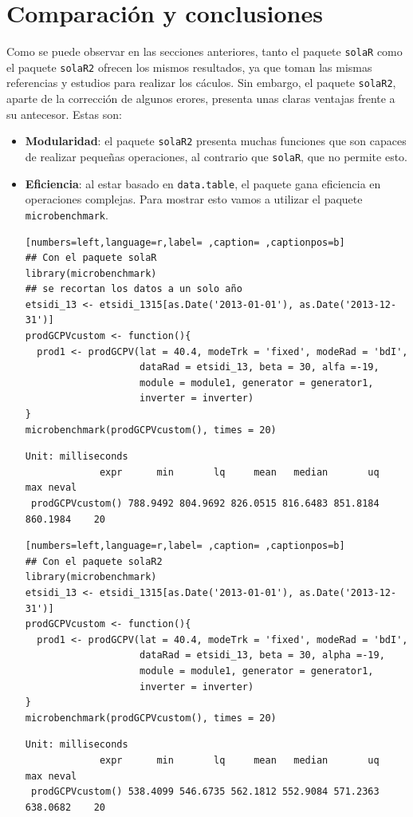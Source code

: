 \section{Comparación y conclusiones}
\label{sec:org032a66a}
\label{sec:comparacion-conclusiones}
Como se puede observar en las secciones anteriores, tanto el paquete \texttt{solaR} como el paquete \texttt{solaR2} ofrecen los mismos resultados, ya que toman las mismas referencias y estudios para realizar los cáculos. Sin embargo, el paquete \texttt{solaR2}, aparte de la corrección de algunos erores, presenta unas claras ventajas frente a su antecesor. Estas son:
\begin{itemize}
\item \textbf{Modularidad}: el paquete \texttt{solaR2} presenta muchas funciones que son capaces de realizar pequeñas operaciones, al contrario que \texttt{solaR}, que no permite esto.
\item \textbf{Eficiencia}: al estar basado en \texttt{data.table}, el paquete gana eficiencia en operaciones complejas. Para mostrar esto vamos a utilizar el paquete \texttt{microbenchmark}.
\begin{lstlisting}[numbers=left,language=r,label= ,caption= ,captionpos=b]
## Con el paquete solaR
library(microbenchmark)
## se recortan los datos a un solo año
etsidi_13 <- etsidi_1315[as.Date('2013-01-01'), as.Date('2013-12-31')]
prodGCPVcustom <- function(){  
  prod1 <- prodGCPV(lat = 40.4, modeTrk = 'fixed', modeRad = 'bdI',
                    dataRad = etsidi_13, beta = 30, alfa =-19,
                    module = module1, generator = generator1,
                    inverter = inverter)
}
microbenchmark(prodGCPVcustom(), times = 20)
\end{lstlisting}

\begin{verbatim}
Unit: milliseconds
             expr      min       lq     mean   median       uq      max neval
 prodGCPVcustom() 788.9492 804.9692 826.0515 816.6483 851.8184 860.1984    20
\end{verbatim}


\begin{lstlisting}[numbers=left,language=r,label= ,caption= ,captionpos=b]
## Con el paquete solaR2
library(microbenchmark)
etsidi_13 <- etsidi_1315[as.Date('2013-01-01'), as.Date('2013-12-31')]
prodGCPVcustom <- function(){  
  prod1 <- prodGCPV(lat = 40.4, modeTrk = 'fixed', modeRad = 'bdI',
                    dataRad = etsidi_13, beta = 30, alpha =-19,
                    module = module1, generator = generator1,
                    inverter = inverter)
}
microbenchmark(prodGCPVcustom(), times = 20)
\end{lstlisting}

\begin{verbatim}
Unit: milliseconds
             expr      min       lq     mean   median       uq      max neval
 prodGCPVcustom() 538.4099 546.6735 562.1812 552.9084 571.2363 638.0682    20
\end{verbatim}
\end{itemize}
